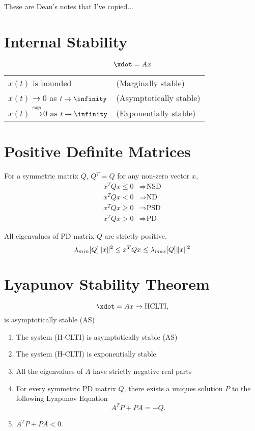 \documentclass{article}
\begin{document}

These are Dean's notes that I've copied...
\section{Internal Stability}
\begin{equation}
  \xdot = Ax
\end{equation}
\begin{tabular}{ll}
$x(t)$ is bounded & (Marginally stable)\\
$x(t) \rightarrow 0$ as $t\rightarrow\infinity$ & (Asymptotically
stable)\\
$x(t) \stackrel{exp}{\rightarrow} 0$ as $t\rightarrow\infinity$ &
(Exponentially stable)
\end{tabular}

\section{Positive Definite Matrices}
For a symmetric matrix $Q$, $Q^T = Q$ for any non-zero vector $x$, 
\begin{equation*}
  \begin{split}
  x^TQx \le 0 & \Rightarrow \text{NSD} \\
  x^TQx < 0   & \Rightarrow \text{ND} \\
  x^TQx \ge 0 & \Rightarrow \text{PSD} \\
  x^TQx > 0   & \Rightarrow \text{PD} 
  \end{split}
\end{equation*}

All eigenvalues of PD matrix  $Q$ are strictly positive.
\begin{equation}
  \lambda_{min}[Q]\lVert x\rVert^2 \le x^TQx \le \lambda_{max}[Q]\lVert x\rVert^2
\end{equation}


\section{Lyapunov Stability Theorem}
\begin{equation}
  \xdot = Ax \rightarrow \text{HCLTI},
\end{equation}
is asymptotically stable (AS)

\begin{enumerate}
\item The system (H-CLTI) is asymptotically stable (AS)
\item The system (H-CLTI) is exponentially stable
\item All the eigenvalues of $A$ have strictly negative real parts
\item For every symmetric PD matrix $Q$, there exists a uniques
  solution $P$ to the following Lyapunov Equation
  \begin{equation}
  A^TP + PA = -Q.
  \end{equation}
\item $A^TP + PA < 0$.
\end{enumerate}
\end{document}
